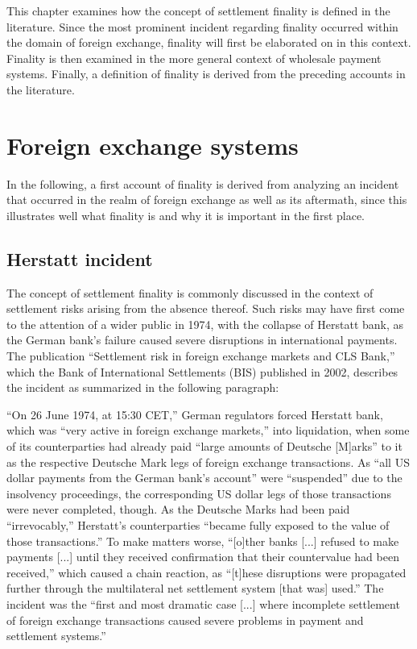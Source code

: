 This chapter examines how the concept of settlement finality is defined in the literature.
Since the most prominent incident regarding finality occurred within the domain of foreign exchange, finality will first be elaborated on in this context.
Finality is then examined in the more general context of wholesale payment systems.
Finally, a definition of finality is derived from the preceding accounts in the literature.

\section{Foreign exchange systems}

In the following, a first account of finality is derived from analyzing an incident that occurred in the realm of foreign exchange as well as its aftermath, since this illustrates well what finality is and why it is important in the first place.

\subsection{Herstatt incident}

The concept of settlement finality is commonly discussed in the context of settlement risks arising from the absence thereof.
Such risks may have first come to the attention of a wider public in 1974, with the collapse of Herstatt bank, as the German bank's failure caused severe disruptions in international payments.
The publication ``Settlement risk in foreign exchange markets and CLS Bank,'' \autocite{galati2002} which the Bank of International Settlements (BIS) published in 2002, describes the incident as summarized in the following paragraph: \autocite[55, 56]{galati2002}

``On 26 June 1974, at 15:30 CET,'' German regulators forced Herstatt bank, which was ``very active in foreign exchange markets,'' into liquidation, when some of its counterparties had already paid ``large amounts of Deutsche [M]arks'' to it as the respective Deutsche Mark legs of foreign exchange transactions.
As ``all US dollar payments from the German bank's account'' were ``suspended'' due to the insolvency proceedings, the corresponding US dollar legs of those transactions were never completed, though.
As the Deutsche Marks had been paid ``irrevocably,'' Herstatt's counterparties ``became fully exposed to the value of those transactions.''
To make matters worse, ``[o]ther banks [...] refused to make payments [...] until they received confirmation that their countervalue had been received,'' which caused a chain reaction, as ``[t]hese disruptions were propagated further through the multilateral net settlement system [that was] used.''
The incident was the ``first and most dramatic case [...] where incomplete settlement of foreign exchange transactions caused severe problems in payment and settlement systems.''

